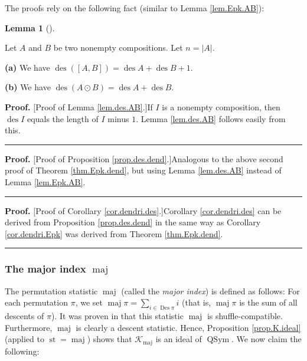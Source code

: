 \documentclass[numbers=enddot,12pt,final,onecolumn,notitlepage]{scrartcl}%
\theoremstyle{definition}
\newtheorem{lem}[theo]{Lemma}
\newenvironment{lemma}[1][]
{\begin{lem}[#1]\begin{leftbar}}
{\end{leftbar}\end{lem}}
\newenvironment{proof}[1][Proof]{\noindent\textbf{#1.} }{\ \rule{0.5em}{0.5em}}
\newenvironment{verlong}{}{}
\let\sumnonlimits\sum
\renewcommand{\sum}{\sumnonlimits\limits}
\begin{document}
\begin{verlong}
The proofs rely on the following fact (similar to Lemma \ref{lem.Epk.AB}):

\begin{lemma}
\label{lem.des.AB}Let $A$ and $B$ be two nonempty compositions. Let
$n=\left\vert A\right\vert $.

\textbf{(a)} We have $\operatorname*{des}\left(  \left[  A,B\right]  \right)
=\operatorname*{des}A+\operatorname*{des}B+1$.

\textbf{(b)} We have $\operatorname*{des}\left(  A\odot B\right)
=\operatorname*{des}A+\operatorname*{des}B$.
\end{lemma}

\begin{proof}
[Proof of Lemma \ref{lem.des.AB}.]If $I$ is a nonempty composition, then
$\operatorname*{des}I$ equals the length of $I$ minus $1$. Lemma
\ref{lem.des.AB} follows easily from this.
\end{proof}

\begin{proof}
[Proof of Proposition \ref{prop.des.dend}.]Analogous to the above second proof
of Theorem \ref{thm.Epk.dend}, but using Lemma \ref{lem.des.AB} instead of
Lemma \ref{lem.Epk.AB}.
\end{proof}

\begin{proof}
[Proof of Corollary \ref{cor.dendri.des}.]Corollary \ref{cor.dendri.des} can
be derived from Proposition \ref{prop.des.dend} in the same way as Corollary
\ref{cor.dendri.Epk} was derived from Theorem \ref{thm.Epk.dend}.
\end{proof}

\subsubsection{The major index $\operatorname*{maj}$}

The permutation statistic $\operatorname*{maj}$ (called the \textit{major
index}) is defined as follows: For each permutation $\pi$, we set
$\operatorname*{maj}\pi=\sum_{i\in\operatorname*{Des}\pi}i$ (that is,
$\operatorname*{maj}\pi$ is the sum of all descents of $\pi$). It was proven
in \cite[Theorem 3.1 \textbf{(a)}]{part1} that this statistic
$\operatorname*{maj}$ is shuffle-compatible. Furthermore, $\operatorname*{maj}%
$ is clearly a descent statistic. Hence, Proposition \ref{prop.K.ideal}
(applied to $\operatorname*{st}=\operatorname*{maj}$) shows that
$\mathcal{K}_{\operatorname*{maj}}$ is an ideal of $\operatorname*{QSym}$. We
now claim the following:


\end{verlong}
\end{document}
